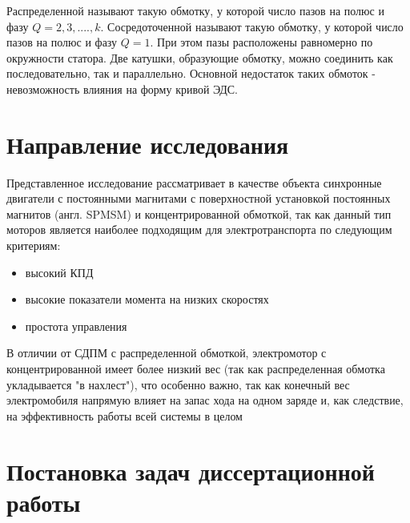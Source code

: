 Распределенной называют такую обмотку, у которой число пазов на полюс и фазу $Q = 2, 3,...., k$.
Сосредоточенной называют такую обмотку, у которой число пазов на полюс и фазу $Q = 1$. При этом пазы расположены равномерно по окружности статора. Две катушки, образующие обмотку, можно соединить как последовательно, так и параллельно. Основной недостаток таких обмоток - невозможность влияния на форму кривой ЭДС.

\section{Направление исследования} \label{sec:ch1/sec2}

Представленное исследование рассматривает в качестве объекта синхронные двигатели с постоянными магнитами с поверхностной установкой постоянных магнитов (англ. SPMSM) и концентрированной обмоткой, так как данный тип моторов является наиболее подходящим для электротранспорта по следующим критериям: 
\begin{itemize}
\item высокий КПД
\item высокие показатели момента на низких скоростях
\item простота управления
\end{itemize}

В отличии от СДПМ с распределенной обмоткой, электромотор с концентрированной имеет более низкий вес (так как распределенная обмотка укладывается "в нахлест"), что особенно важно, так как конечный вес электромобиля напрямую влияет на запас хода на одном заряде и, как следствие, на эффективность работы всей системы в целом

\section{Постановка задач диссертационной работы}
\label{sec:ch1/sec3}


